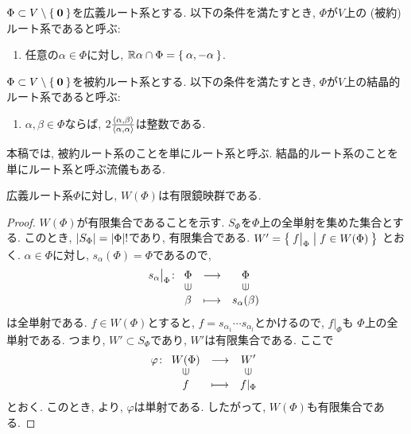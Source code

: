 \begin{definition}
  $\Phi \subset V \setminus \Set{\boldsymbol{0}}$を広義ルート系とする.
  以下の条件を満たすとき, $\Phi$が$V$上の (被約) ルート系であると呼ぶ:
  \begin{enumerate}
  \item 任意の$\alpha \in \Phi$に対し,
    $\mathbb{R}\alpha \cap \Phi = \Set{\alpha,-\alpha}$.
  \end{enumerate}
\end{definition}

\begin{definition}
  $\Phi \subset V \setminus \Set{\boldsymbol{0}}$を被約ルート系とする.
  以下の条件を満たすとき, $\Phi$が$V$上の結晶的ルート系であると呼ぶ:
  \begin{enumerate}
    \item
    $\alpha,\beta\in\Phi$ならば,
      $2\frac{\Braket{\alpha,\beta}}{\Braket{\alpha,\alpha}}$は整数である.
  \end{enumerate}
\end{definition}

\begin{remark}
  本稿では,
  被約ルート系のことを単にルート系と呼ぶ.
  結晶的ルート系のことを単にルート系と呼ぶ流儀もある.
\end{remark}

\begin{prop}
広義ルート系$\Phi$に対し,
$W(\Phi)$は有限鏡映群である.
\end{prop}
\begin{proof}
  $W(\Phi)$が有限集合であることを示す.
  $S_\Phi$を$\Phi$上の全単射を集めた集合とする.
  このとき, $\left|S_\Phi\right|=\left|\Phi\right|!$であり,
  有限集合である.
  $W'=\Set{f\bigr|_{\Phi}|f \in W(\Phi)}$
  とおく.
  $\alpha\in\Phi$に対し, $s_\alpha(\Phi)=\Phi$であるので,
  \begin{align*}
    s_\alpha\restrictedto{\Phi}\colon
    \Shazo{\Phi}{\Phi}
          {\beta}{s_\alpha(\beta)}
  \end{align*}
  は全単射である.
  $f\in W(\Phi)$とすると,
  $f=s_{\alpha_1}\cdots s_{\alpha_l}$とかけるので,
  $f|_\Phi$も
  $\Phi$上の全単射である.
  つまり, $W'\subset S_\Phi$であり, $W'$は有限集合である.
  ここで
  \begin{align*}
    \varphi\colon
    \Shazo{W(\Phi)}{W'}
          {f}{f|_{\Phi}}
  \end{align*}
  とおく.
  このとき,
  より,
  $\varphi$は単射である.
  したがって, $W(\Phi)$も有限集合である.
\end{proof}

